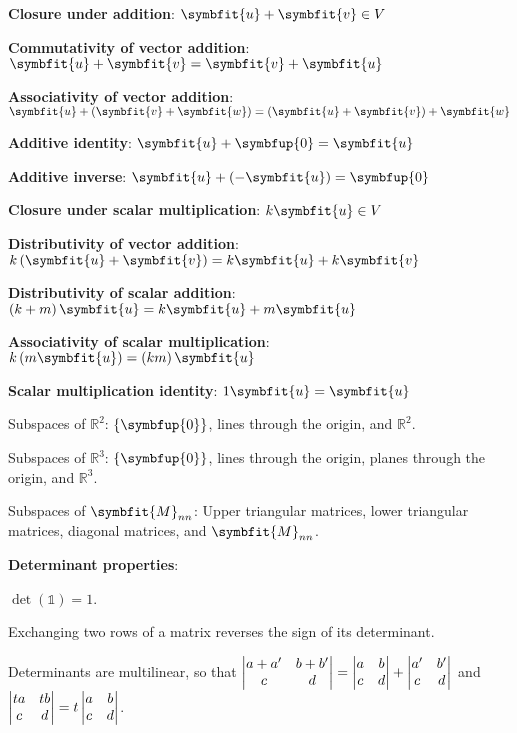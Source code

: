 \documentclass{article}
\begin{document}
\noindent\textbf{Closure under addition}: $\symbfit{u}+\symbfit{v} \in V$ 

\noindent\textbf{Commutativity of vector addition}: $\symbfit{u} + \symbfit{v} = \symbfit{v} + \symbfit{u}$

\noindent\textbf{Associativity of vector addition}: $\symbfit{u} + \left(\symbfit{v} + \symbfit{w}\right) = \left(\symbfit{u} + \symbfit{v}\right) + \symbfit{w}$

\noindent\textbf{Additive identity}: $\symbfit{u} + \symbfup{0} = \symbfit{u}$

\noindent\textbf{Additive inverse}: $\symbfit{u} + \left(-\symbfit{u}\right) = \symbfup{0}$

\noindent\textbf{Closure under scalar multiplication}: $k\symbfit{u} \in V$

\noindent\textbf{Distributivity of vector addition}: $k \left(\symbfit{u} + \symbfit{v}\right) = k\symbfit{u} + k\symbfit{v}$

\noindent\textbf{Distributivity of scalar addition}: $\left(k+m\right)\symbfit{u} = k\symbfit{u} + m\symbfit{u}$

\noindent\textbf{Associativity of scalar multiplication}: $k\left(m\symbfit{u}\right)=\left(km\right)\symbfit{u}$

\noindent\textbf{Scalar multiplication identity}: $1 \symbfit{u}=\symbfit{u}$

\noindent Subspaces of $\mathbb{R}^2$: $\left\{ \symbfup{0} \right\}$, lines through the origin, and $\mathbb{R}^2$.

\noindent Subspaces of $\mathbb{R}^3$: $\left\{ \symbfup{0} \right\}$, lines through the origin, planes through the origin, and $\mathbb{R}^3$.

\noindent Subspaces of $\symbfit{M}_{nn}$: Upper triangular matrices, lower triangular matrices, diagonal matrices, and $\symbfit{M}_{nn}$.

\noindent\textbf{Determinant properties}:

\noindent$\det{\left( \mathbb{1} \right)}=1$. 

\noindent Exchanging two rows of a matrix reverses the sign of its determinant. 

\noindent Determinants are multilinear, so that $\mdet{a+a' & b+b' \\ c & d} = \mdet{a & b \\ c & d}+\mdet{a' & b' \\ c & d}$ and $\mdet{ta & tb \\ c & d}=t\mdet{a & b \\ c & d}$. 
\end{document}

